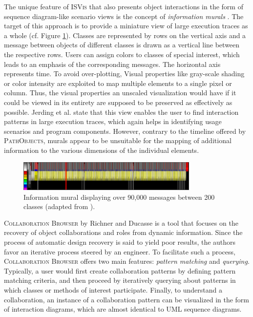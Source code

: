 The unique feature of \textsc{ISVis} \cite{jerding_using_1997} that also presents object interactions in the form of sequence diagram-like scenario views is the concept of \emph{ information murals} \cite{jerding_information_1998, jerding_visualizing_1996}.
The target of this approach is to provide a miniature view of large execution traces as a whole (cf. Figure \ref{fig:NotationMural}).
Classes are represented by rows on the vertical axis and a message between objects of different classes is drawn as a vertical line between the respective rows.
Users can assign colors to classes of special interest, which leads to an emphasis of the corresponding messages.
The horizontal axis represents time.
To avoid over-plotting, Visual properties like gray-scale shading or color intensity are exploited to map multiple elements to a single pixel or column.
Thus, the visual properties an unscaled visualization would have if it could be viewed in its entirety are supposed to be preserved as effectively as possible.
Jerding et al. state that this view enables the user to find interaction patterns in large execution traces, which again helps in identifying usage scenarios and program components.
However, contrary to the timeline offered by \textsc{PathObjects}, murals appear to be unsuitable for the mapping of additional information to the various dimensions of the individual elements.

\begin{figure}[tb]
	\centering
	\includegraphics[width=0.8\textwidth]{../images/06-Mural}
	\caption[Information Mural by Jerding et al.]{Information mural displaying over 90,000 messages between 200 classes (adapted from \cite{jerding_information_1998}).}
	\label{fig:NotationMural}
\end{figure}

\textsc{Collaboration Browser} by Richner and Ducasse \cite{richner_using_2002} is a tool that focuses on the recovery of object collaborations and roles from dynamic information.
Since the process of automatic design recovery is said to yield poor results, the authors favor an iterative process steered by an engineer.
To facilitate such a process, \textsc{Collaboration Browser} offers two main features: \emph{pattern matching} and \emph{querying}. 
Typically, a user would first create collaboration patterns by defining pattern matching criteria, and then proceed by iteratively querying about patterns in which classes or methods of interest participate.
Finally, to understand a collaboration, an instance of a collaboration pattern can be visualized in the form of interaction diagrams, which are almost identical to UML sequence diagrams.

